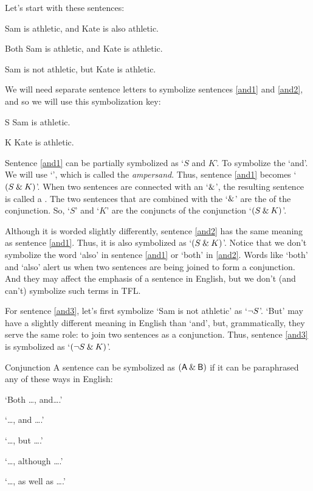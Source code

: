 Let's start with these sentences:
	\begin{earg}
		\item[\ex{and1}] Sam is athletic, and Kate is also athletic.
		\item[\ex{and2}] Both Sam is athletic, and Kate is athletic.
		\item[\ex{and3}] Sam is not athletic, but Kate is athletic.
	\end{earg}
We will need separate sentence letters to symbolize sentences \ref{and1} and \ref{and2}, and so we will use this symbolization key:
	\begin{ekey}
		\item[S] Sam is athletic.
		\item[K] Kate is athletic.
	\end{ekey}
Sentence \ref{and1} can be partially symbolized as `$S$ and $K$'. To symbolize the `and'. We will use `\eand', which is called the \textit{ampersand}. Thus, sentence \ref{and1} becomes `$(S\mathbin{\&} K)$'. When two sentences are connected with an `$\mathbin{\&}$', the resulting sentence is called a . The two sentences that are combined with the `$\mathbin{\&}$' are the  of the conjunction. So, `$S$' and `$K$' are the conjuncts of the conjunction `$(S\mathbin{\&} K)$'.

Although it is worded slightly differently, sentence \ref{and2} has the same meaning as sentence \ref{and1}. Thus, it is also symbolized as `$(S\mathbin{\&} K)$'.
Notice that we don't symbolize the word `also' in sentence \ref{and1} or `both' in \ref{and2}. Words like `both' and `also' alert us when two sentences are being joined to form a conjunction. And they may affect the emphasis of a sentence in English, but we don't (and can't) symbolize such terms in TFL. 

For sentence \ref{and3}, let's first symbolize `Sam is not athletic' as `${\neg} S$'. `But' may have a slightly different meaning in English than `and', but, grammatically, they serve the same role: to join two sentences as a conjunction. Thus, sentence \ref{and3} is symbolized as `$({\neg} S \mathbin{\&} K)$'.


\begin{factboxy}{Conjunction}
A sentence can be symbolized as $(\mathsf{A}\mathbin{\&}\mathsf{B})$ if it can be paraphrased any of these ways in English:
\vspace{-2mm}
\begin{earg}
\item[] `Both \ldots, and\ldots.'
\item[] `\ldots, and \ldots.'
\item[] `\ldots, but \ldots.' 
\item[] `\ldots, although \ldots.'
\item[] `\ldots, as well as \ldots.'
\end{earg}
\end{factboxy}
	

